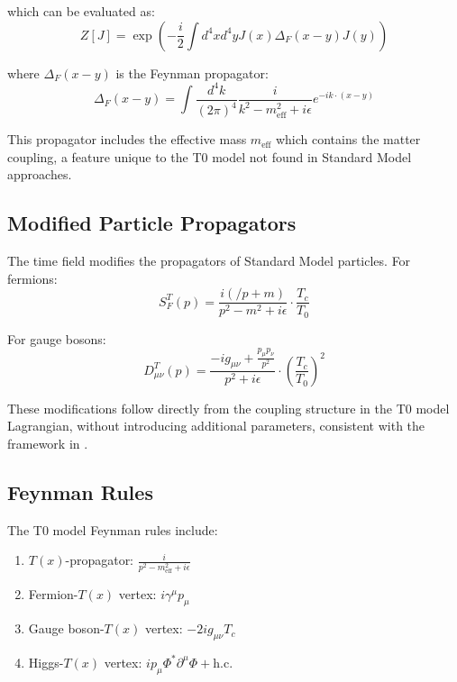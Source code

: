 \documentclass[12pt,a4paper]{article}
\begin{document}
	which can be evaluated as:
	\begin{equation}
		Z[J] = \exp\left(-\frac{i}{2}\int d^4x d^4y J(x)\Delta_F(x-y)J(y)\right)
		\label{eq:evaluated_functional}
	\end{equation}
	
	where $\Delta_F(x-y)$ is the Feynman propagator:
	\begin{equation}
		\Delta_F(x-y) = \int \frac{d^4k}{(2\pi)^4} \frac{i}{k^2 - m_{\text{eff}}^2 + i\epsilon} e^{-ik \cdot (x-y)}
		\label{eq:feynman_propagator}
	\end{equation}
	
	This propagator includes the effective mass $m_{\text{eff}}$ which contains the matter coupling, a feature unique to the T0 model not found in Standard Model approaches.
	
	\subsection{Modified Particle Propagators}
	\label{subsec:modified_propagators}
	
	The time field modifies the propagators of Standard Model particles. For fermions:
	\begin{equation}
		S_F^T(p) = \frac{i(\slash{p} + m)}{p^2 - m^2 + i\epsilon} \cdot \frac{T_c}{T_0}
		\label{eq:fermion_propagator}
	\end{equation}
	
	For gauge bosons:
	\begin{equation}
		D_{\mu\nu}^T(p) = \frac{-ig_{\mu\nu} + \frac{p_{\mu}p_{\nu}}{p^2}}{p^2 + i\epsilon} \cdot \left(\frac{T_c}{T_0}\right)^2
		\label{eq:gauge_propagator}
	\end{equation}
	
	These modifications follow directly from the coupling structure in the T0 model Lagrangian, without introducing additional parameters, consistent with the framework in \cite{Pascher2025Lagrange}.
	
	\subsection{Feynman Rules}
	\label{subsec:feynman_rules}
	
	The T0 model Feynman rules include:
	
	\begin{enumerate}
		\item $T(x)$-propagator: $\frac{i}{p^2 - m_{\text{eff}}^2 + i\epsilon}$
		\item Fermion-$T(x)$ vertex: $i\gamma^{\mu}p_{\mu}$
		\item Gauge boson-$T(x)$ vertex: $-2ig_{\mu\nu}T_c$
		\item Higgs-$T(x)$ vertex: $ip_{\mu}\Phi^*\partial^{\mu}\Phi + \text{h.c.}$
	\end{enumerate}
	
\end{document}
